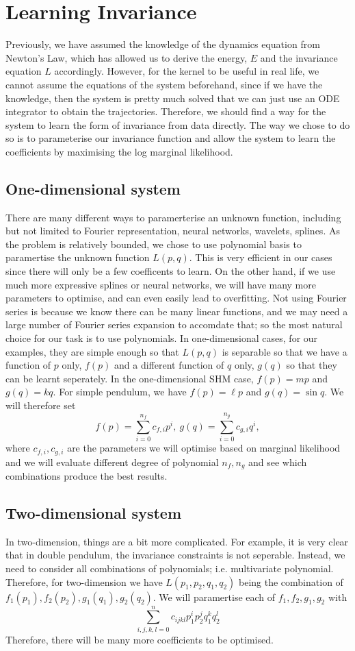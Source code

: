 \documentclass{statsmsc}
\begin{document}
\section{Learning Invariance}
Previously, we have assumed the knowledge of the dynamics equation from Newton's Law, which has allowed us to derive the energy, $E$ and the invariance equation $L$ accordingly. 
However, for the kernel to be useful in real life, we cannot assume the equations of the system beforehand, since if we have the knowledge, then the system is pretty much solved that we can just use an ODE integrator to obtain the trajectories. 
Therefore, we should find a way for the system to learn the form of invariance from data directly.
The way we chose to do so is to parameterise our invariance function and allow the system to learn the coefficients by maximising the log marginal likelihood.

\subsection{One-dimensional system}
There are many different ways to paramerterise an unknown function, including but not limited to Fourier representation, neural networks, wavelets, splines.
As the problem is relatively bounded, we chose to use polynomial basis to paramertise the unknown function $L(p,q)$.
This is very efficient in our cases since there will only be a few coefficents to learn.
On the other hand, if we use much more expressive splines or neural networks, we will have many more parameters to optimise, and can even easily lead to overfitting.
Not using Fourier series is because we know there can be many linear functions, and we may need a large number of Fourier series expansion to accomdate that; so the most natural choice for our task is to use polynomials.
In one-dimensional cases, for our examples, they are simple enough so that $L(p,q)$ is separable so that we have a function of $p$ only, $f(p)$ and a different function of $q$ only, $g(q)$ so that they can be learnt seperately.
In the one-dimensional SHM case, $f(p)=mp$ and $g(q)=kq$.
For simple pendulum, we have $f(p)=\ell p$ and $g(q)=\sin q$.
We will therefore set $$f(p)=\sum_{i=0}^{n_f}c_{f,i}p^i,\ g(q)=\sum_{i=0}^{n_g}c_{g,i}q^i,$$
where $c_{f,i}, c_{g,i}$ are the parameters we will optimise based on marginal likelihood and we will evaluate different degree of polynomial $n_f, n_g$ and see which combinations produce the best results. 

\subsection{Two-dimensional system}
In two-dimension, things are a bit more complicated. 
For example, it is very clear that in double pendulum, the invariance constraints is not seperable.
Instead, we need to consider all combinations of polynomials; i.e. multivariate polynomial.
Therefore, for two-dimension we have $L(p_1, p_2, q_1, q_2)$ being the combination of $f_1(p_1), f_2(p_2), g_1(q_1), g_2(q_2)$.
We will paramertise each of $f_1, f_2, g_1, g_2$ with $$\sum_{i,j,k,l=0}^{n}c_{ijkl}p_1^ip_2^jq_1^kq_2^l$$
Therefore, there will be many more coefficients to be optimised.
\end{document}
